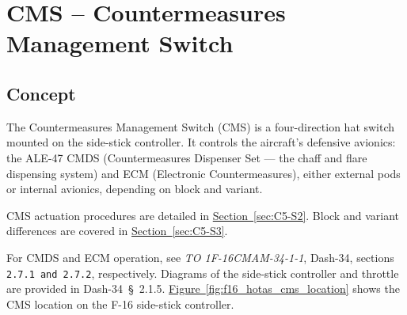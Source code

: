 \documentclass[11pt, a4paper, twoside]{report}
\newcommand{\dashref}[1]{Dash-34~\S~#1}
\newcommand{\dashrefs}[1]{\textit{TO 1F-16CMAM-34-1-1}, Dash-34, sections \texttt{#1}}
\newcommand{\secref}[1]{\hyperref[#1]{Section~\ref*{#1}}}
\newcommand{\figref}[1]{\hyperref[#1]{Figure~\ref*{#1}}}
\begin{document}


\chapter{CMS – Countermeasures Management Switch}
\label{chap:C5}

\section{Concept}
\label{sec:C5-S1}

The Countermeasures Management Switch (CMS) is a four-direction hat switch mounted on the side-stick controller. It controls the aircraft's defensive avionics: the ALE-47 CMDS (Countermeasures Dispenser Set — the chaff and flare dispensing system) and ECM (Electronic Countermeasures), either external pods or internal avionics, depending on block and variant.

CMS actuation procedures are detailed in \secref{sec:C5-S2}. Block and variant differences are covered in \secref{sec:C5-S3}.

For CMDS and ECM operation, see \dashrefs{2.7.1 and 2.7.2}, respectively. Diagrams of the side-stick controller and throttle are provided in \dashref{2.1.5}. \figref{fig:f16_hotas_cms_location} shows the CMS location on the F-16 side-stick controller.
\end{document}
